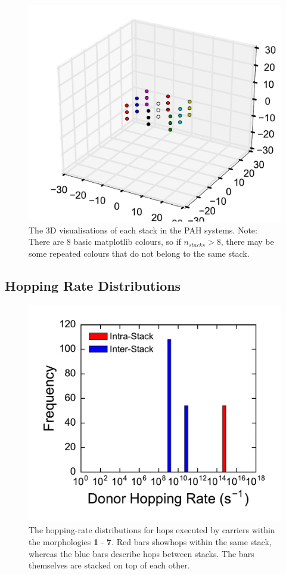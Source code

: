 \documentclass[12pt]{article}
\begin{document}
\begin{figure}[h!]\centering
	\includegraphics[width=\textwidth]{Figures/stacks.pdf}
    \caption{The 3D visualisations of each stack in the PAH systems. Note: There are 8 basic matplotlib colours, so if $n_{stacks} > 8$, there may be some repeated colours that do not belong to the same stack.}
	\label{fig:stacks}
\end{figure}

\clearpage

\subsection{Hopping Rate Distributions}


\begin{figure}[h!]\centering
	\includegraphics[width=\textwidth]{Figures/DonorHoppingRateMixed.pdf}
    \caption{The hopping-rate distributions for hops executed by carriers within the morphologies \textbf{1} - \textbf{7}. Red bars showhops within the same stack, whereas the blue bars describe hops between stacks. The bars themselves are stacked on top of each other.}
	\label{fig:HoppingRateMixed}
\end{figure}



\end{document}
